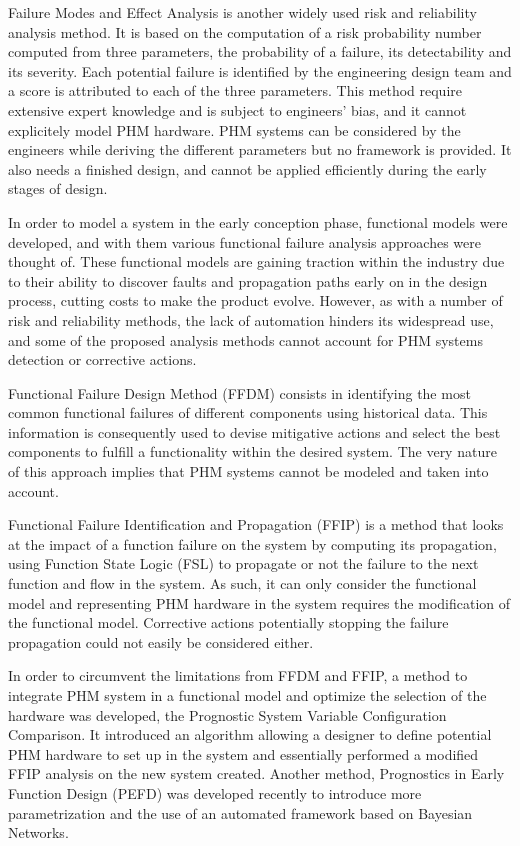 Failure Modes and Effect Analysis is another widely used risk and reliability analysis method. It is based on the computation of a risk probability number computed from three parameters, the probability of a failure, its detectability and its severity. Each potential failure is identified by the engineering design team and a score is attributed to each of the three parameters. This method require extensive expert knowledge and is subject to engineers' bias, and it cannot explicitely model PHM hardware. PHM systems can be considered by the engineers while deriving the different parameters but no framework is provided. It also needs a finished design, and cannot be applied efficiently during the early stages of design.

In order to model a system in the early conception phase, functional models were developed, and with them various functional failure analysis approaches were thought of. These functional models are gaining traction within the industry due to their ability to discover faults and propagation paths early on in the design process, cutting costs to make the product evolve. However, as with a number of risk and reliability methods, the lack of automation hinders its widespread use, and some of the proposed analysis methods cannot account for PHM systems detection or corrective actions.

Functional Failure Design Method (FFDM) consists in identifying the most common functional failures of different components using historical data. This information is consequently used to devise mitigative actions and select the best components to fulfill a functionality within the desired system. The very nature of this approach implies that PHM systems cannot be modeled and taken into account.

Functional Failure Identification and Propagation (FFIP) is a method that looks at the impact of a function failure on the system by computing its propagation, using Function State Logic (FSL) to propagate or not the failure to the next function and flow in the system. As such, it can only consider the functional model and representing PHM hardware in the system requires the modification of the functional model. Corrective actions potentially stopping the failure propagation could not easily be considered either.

In order to circumvent the limitations from FFDM and FFIP, a method to integrate PHM system in a functional model and optimize the selection of the hardware was developed, the Prognostic System Variable Configuration Comparison. It introduced an algorithm allowing a designer to define potential PHM hardware to set up in the system and essentially performed a modified FFIP analysis on the new system created. Another method, Prognostics in Early Function Design (PEFD) was developed recently to introduce more parametrization and the use of an automated framework based on Bayesian Networks.

